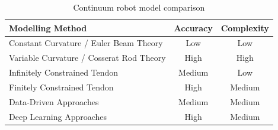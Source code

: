 \begin{table}[h]
    \centering
    \caption{Continuum robot model comparison}
    \begin{tabular}{l|c|c}
        \textbf{Modelling Method} & \textbf{Accuracy} & \textbf{Complexity} \\
        \hline
        Constant Curvature / Euler Beam Theory & Low & Low \\
        Variable Curvature / Cosserat Rod Theory & High & High \\
        Infinitely Constrained Tendon & Medium & Low \\
        Finitely Constrained Tendon & High & Medium \\
        Data-Driven Approaches & Medium & Medium \\
        Deep Learning Approaches & High & Medium \\
    \end{tabular}   
    \label{tab:model_comparison}
\end{table}